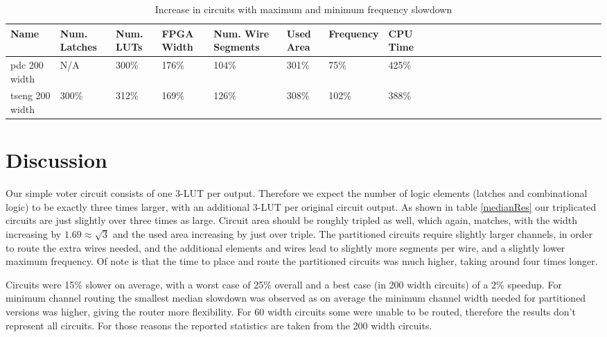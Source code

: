\documentclass[12pt,final,oneside]{memoir} %
\begin{document}
\begin{table}
    \begin{adjustwidth}{-1cm}{-1.1cm}
        \begin{tabularx}{1.1\textwidth}{XXXXXXXXXXXXXXXXXXXXXXXXXX}
           \toprule
            Name & Num. Latches & Num. \acp{LUT} & FPGA Width & Num. Wire Segments & Used Area & Frequency & CPU Time\\
            \midrule
pdc 200 width   & N/A   & 300\% & 176\% & 104\% & 301\% &  75\% & 425\%\\
tseng 200 width & 300\% & 312\% & 169\% & 126\% & 308\% &  102\% & 388\%\\
          \bottomrule
        \end{tabularx}
        \caption{Increase in circuits with maximum and minimum frequency slowdown}
        \label{timing}
    \end{adjustwidth}
\end{table}
\section{Discussion}
Our simple voter circuit consists of one 3-\ac{LUT} per output. Therefore we expect the number of logic elements (latches and combinational logic) to be exactly three times larger, with an additional 3-\ac{LUT} per original circuit output. As shown in table \ref{medianRes} our triplicated circuits are just slightly over three times as large. Circuit area should be roughly tripled as well, which again, matches, with the width increasing by $1.69 \approx \sqrt{3}$ and the used area increasing by just over triple. The partitioned circuits require slightly larger channels, in order to route the extra wires needed, and the additional elements and wires lead to slightly more segments per wire, and a slightly lower maximum frequency. Of note is that the time to place and route the partitioned circuits was much higher, taking around four times longer.

Circuits were 15\% slower on average, with a worst case of 25\% overall and a best case (in 200 width circuits) of a 2\% speedup. For minimum channel routing the smallest median slowdown was observed as on average the minimum channel width needed for partitioned versions was higher, giving the router more flexibility. For 60 width circuits some were unable to be routed, therefore the results don't represent all circuits. For those reasons the reported statistics are taken from the 200 width circuits.
\end{document}
